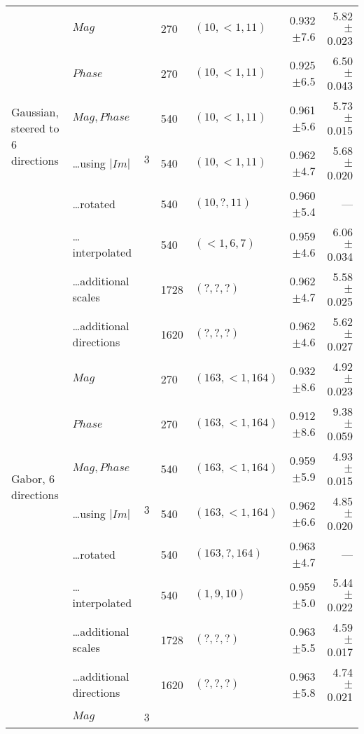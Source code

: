 \begin{tabularx}{\linewidth}{p{3cm} X X X X r r}
\midrule
\multirow{6}{2cm}{Gaussian, steered to 6 directions}
        & $Mag$                     & \multirow{7}{1cm}{ 3 }
                                    &    270 &$(10, {<}1, 11)$    & 0.932$\pm$7.6     & 5.82$\pm$0.023 \\
        & $Phase$                   &&   270 &$(10, {<}1, 11)$    & 0.925$\pm$6.5    & 6.50$\pm$0.043 \\
        & $Mag, Phase$              &&   540 &$(10, {<}1, 11)$    & 0.961$\pm$5.6     & 5.73$\pm$0.015 \\
        & \ldots using $|Im|$       &&   540 &$(10, {<}1, 11)$    & 0.962$\pm$4.7     & 5.68$\pm$0.020 \\
        & \ldots rotated            &&   540 &$(10, ?, 11)$       & 0.960$\pm$5.4     & --- \\
        & \ldots interpolated       &&   540 &$({<}1, 6, 7)$      & 0.959$\pm$4.6     & 6.06$\pm$0.034 \\
        & \ldots additional scales  &&  1728 &$(?, ?, ?)$      & 0.962$\pm$4.7     & 5.58$\pm$0.025 \\
        & \ldots additional directions&&  1620 &$(?, ?, ?)$    & 0.962$\pm$4.6     & 5.62$\pm$0.027 \\
\midrule
\multirow{6}{2cm}{Gabor, 6 directions}
        & $Mag$                     & \multirow{7}{1cm}{ 3 }
                                    &    270 &$(163, {<}1, 164)$  & 0.932$\pm$8.6     & 4.92$\pm$ 0.023 \\
        & $Phase$                   &&   270 &$(163, {<}1, 164)$  & 0.912$\pm$8.6     & 9.38$\pm$ 0.059 \\
        & $Mag,Phase$               &&   540 &$(163, {<}1, 164)$  & 0.959$\pm$5.9     & 4.93$\pm$ 0.015 \\
        & \ldots using $|Im|$       &&   540 &$(163, {<}1, 164)$  & 0.962$\pm$6.6     & 4.85$\pm$ 0.020 \\
        & \ldots rotated            &&   540 &$(163, ?, 164)$   & 0.963$\pm$4.7     & --- \\
        & \ldots interpolated       &&   540 &$(1, 9, 10)$      & 0.959$\pm$5.0     & 5.44$\pm$0.022 \\
        & \ldots additional scales  &&  1728 &$(?, ?, ?)$      & 0.963$\pm$5.5     & 4.59$\pm$0.017 \\
        & \ldots additional directions&&  1620 &$(?, ?, ?)$    & 0.963$\pm$5.8     & 4.74$\pm$0.021 \\        
\midrule
\multirow{5}{2cm}{\dtcwt{}}
        & $Mag$                     & \multirow{5}{1cm}{ 3 }

\end{tabularx}
